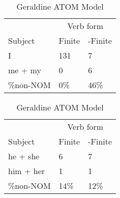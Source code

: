 \begin{table}[]
\caption{Geraldine ATOM Model}
\begin{minipage}{0.5\textwidth}
    \centering
       \begin{tabular}{@{}lll@{}}
        \toprule
         & \multicolumn{2}{c}{Verb form}\\
         \cline{2-3}
        Subject & Finite & -Finite \\
        \midrule
        I & 131 & 7 \\
        me + my & 0 & 6 \\
        \hline
        \%non-NOM & 0\% & 46\% \\
        \bottomrule
    \end{tabular}
\end{minipage}
\begin{minipage}{0.5\textwidth}
    \centering
    \begin{tabular}{@{}lll@{}}
        \toprule
         & \multicolumn{2}{c}{Verb form}\\
         \cline{2-3}
        Subject & Finite & -Finite \\
        \midrule
        he + she & 6 & 7 \\
        him + her & 1 & 1 \\
        \hline
        \%non-NOM & 14\% & 12\% \\
        \bottomrule
    \end{tabular}
    \end{minipage}


\end{table}
